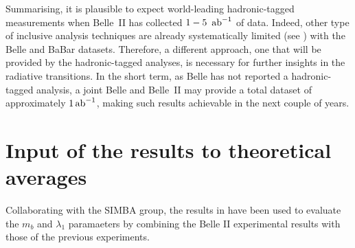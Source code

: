 Summarising, it is plausible to expect world-leading hadronic-tagged \BtoXsgamma measurements when Belle~II has collected $1-5~\mbox{\,ab}^{-1}$ of data.
Indeed, other type of inclusive \BtoXsgamma analysis techniques are already systematically limited (see ) with the Belle and BaBar datasets.
Therefore, a different approach, one that will be provided by the hadronic-tagged analyses, is necessary for further insights in the radiative \BtoXsgamma transitions.
In the short term, as Belle has not reported a hadronic-tagged \BtoXsgamma analysis, a joint Belle and Belle~II may provide a total dataset of approximately $1\mbox{\,ab}^{-1}$, making such results achievable in the next couple of years.

\section{Input of the results to theoretical averages}\label{sec:input_to_theory}

Collaborating with the SIMBA group, the results in 
have been used to evaluate the $m_b$ and $\lambda_1$ paramaeters by combining the Belle II experimental results
with those of the previous experiments.

